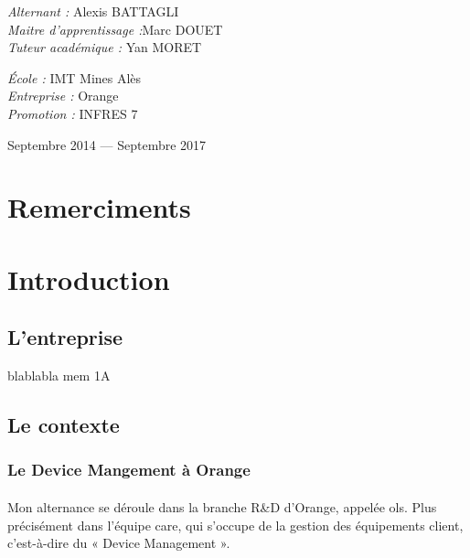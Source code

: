 \documentclass[12pt,a4paper]{report}
\begin{document}
\begin{titlepage}
\begin{center}
    \begin{minipage}{0.5\textwidth}
      \begin{flushleft} \large
        \emph{Alternant :} Alexis \textsc{BATTAGLI}\\
        \emph{Maitre d'apprentissage :}Marc \textsc{DOUET}\\
        \emph{Tuteur académique : } Yan \textsc{MORET}
      \end{flushleft}
    \end{minipage}
    \begin{minipage}{0.4\textwidth}
      \begin{flushright} \large
      	\emph{École :} IMT Mines Alès\\
       	\emph{Entreprise :} Orange\\
        \emph{Promotion :} INFRES 7\\
      \end{flushright}
    \end{minipage}

    \vfill

    {\large Septembre 2014 — Septembre 2017}

  \end{center}
\end{titlepage}
\newpage

\section*{Remerciments}
\newpage
\tableofcontents
\printnoidxglossaries
\listoffigures
\newpage

\section{Introduction}
\subsection{L'entreprise}
blablabla mem 1A
\subsection{Le contexte}
\subsubsection{Le Device Mangement à Orange}
\paragraph*{}
Mon alternance se déroule dans la branche R\&D d’Orange, appelée \gls{ols}. Plus précisément dans l’équipe \gls{care}, qui s’occupe de la gestion des équipements client, c’est-à-dire du « Device Management ».
\end{document}
